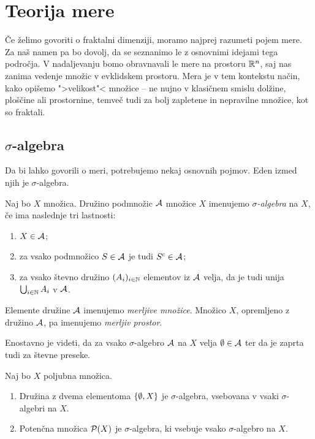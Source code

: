 \section{Teorija mere}
Če želimo govoriti o fraktalni dimenziji, moramo najprej razumeti pojem mere. 
Za naš namen pa bo dovolj, da se seznanimo le z osnovnimi idejami tega področja. 
V nadaljevanju bomo obravnavali le mere na prostoru \(\mathbb{R}^n\), saj nas zanima vedenje množic v evklidskem prostoru. Mera je v tem kontekstu način, kako opišemo ">velikost"< množice -- ne nujno v klasičnem smislu dolžine, ploščine ali prostornine, temveč tudi za bolj zapletene in nepravilne množice, kot so fraktali.

\subsection{\(\sigma\)-algebra}
Da bi lahko govorili o meri, potrebujemo nekaj osnovnih pojmov. Eden izmed njih je \(\sigma\)-algebra.

\begin{definicija}
    Naj bo \(X\) množica. Družino podmnožic \(\mathcal{A}\) množice \(X\) imenujemo \emph{\(\sigma\)-algebra} na \(X\), če ima naslednje tri lastnosti:
    \begin{enumerate}
        \item \(X \in \mathcal{A}\);
        \item za vsako podmnožico \(S \in \mathcal{A}\) je tudi \(S^{\text{c}} \in \mathcal{A}\);
        \item za vsako števno družino \((A_i)_{i \in \mathbb{N}}\) elementov iz \(\mathcal{A}\) velja, da je tudi unija \(\bigcup_{i \in \mathbb{N}} A_i\) v \(\mathcal{A}\).
    \end{enumerate}
    Elemente družine \(\mathcal{A}\) imenujemo \emph{merljive množice}. Množico \(X\), opremljeno z družino \(\mathcal{A}\), pa imenujemo \emph{merljiv prostor}.
\end{definicija}

\begin{opomba}
    Enostavno je videti, da za vsako \(\sigma\)-algebro \(\mathcal{A}\) na \(X\) velja \(\emptyset \in \mathcal{A}\) ter da je zaprta tudi za števne preseke.
\end{opomba}

\begin{zgled}
    Naj bo \(X\) poljubna množica.
    \begin{enumerate}
        \item Družina z dvema elementoma \(\left\{\emptyset, X\right\}\) je \(\sigma\)-algebra, vsebovana v vsaki \(\sigma\)-algebri na \(X\).
        \item Potenčna množica \(\mathcal{P}(X)\) je \(\sigma\)-algebra, ki vsebuje vsako \(\sigma\)-algebro na \(X\).
    \end{enumerate}
\end{zgled}

